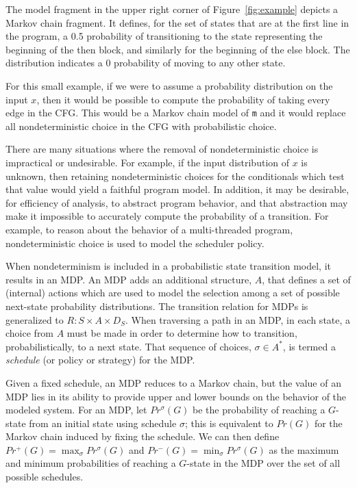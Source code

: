 The model fragment in the upper right corner of 
Figure~\ref{fig:example} depicts a Markov chain fragment.
It defines, for the set of states 
that are at the first line in the program, 
a 0.5 probability of transitioning to 
the state representing the beginning of the then block,
and similarly for the beginning of the else block.  The
distribution indicates a 0 probability of moving to any
other state.

For this small example, if we were to assume a probability
distribution on the input $x$, then it would be possible
to compute the probability of taking every edge in the CFG.   
This would be a Markov chain model of {\tt m} and it would replace
all nondeterministic choice in the CFG with probabilistic choice.

There are many situations where the removal of nondeterministic
choice is impractical or undesirable.  For example, if the input
distribution of $x$ is unknown, then retaining nondeterministic
choices for the conditionals which test that value would yield a
faithful program model.  In addition, it may be desirable, for
efficiency of analysis, to abstract program behavior, and that
abstraction may make it impossible to accurately compute the 
probability of a transition.  For example, to reason about the
behavior of a multi-threaded program, nondeterministic choice is
used to model the scheduler policy.

When nondeterminism is included in a probabilistic state
transition model, it results in an MDP.  
An MDP adds an additional structure, $A$, that defines
a set of (internal) actions which are used to model the
selection among a set of possible next-state probability distributions.
The transition relation
for MDPs is generalized to $R : S \times A \times D_S$.
When traversing a path in an MDP, in each state, a choice
from $A$ must be made in order to determine how to transition,
probabilistically, to a next state.   That sequence of choices, 
$\sigma \in A^*$, is termed a \textit{schedule} (or policy or 
strategy) for the MDP.

Given a fixed schedule, an MDP reduces to a Markov chain, but
the value of an MDP lies in its ability to provide upper and
lower bounds on the behavior of the modeled system.
For an MDP, let $Pr^{\sigma}(G)$ be the probability of reaching
a $G$-state from an initial state using schedule $\sigma$;
this is equivalent to $Pr(G)$ for the Markov chain induced
by fixing the schedule.  We can then define 
$Pr^+(G) = \max_{\sigma} Pr^{\sigma}(G)$
and
$Pr^-(G) = \min_{\sigma} Pr^{\sigma}(G)$
as the maximum and minimum probabilities of reaching a $G$-state
in the MDP over the set of all possible schedules.  
